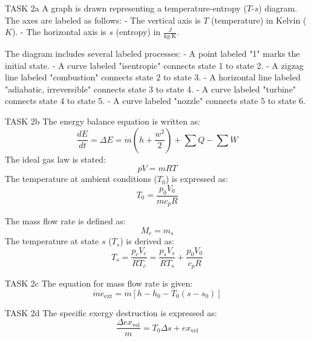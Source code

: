 TASK 2a  
A graph is drawn representing a temperature-entropy (\( T \)-\( s \)) diagram. The axes are labeled as follows:  
- The vertical axis is \( T \) (temperature) in Kelvin (\( K \)).  
- The horizontal axis is \( s \) (entropy) in \( \frac{J}{\text{kg·K}} \).  

The diagram includes several labeled processes:  
- A point labeled "1" marks the initial state.  
- A curve labeled "isentropic" connects state 1 to state 2.  
- A zigzag line labeled "combustion" connects state 2 to state 3.  
- A horizontal line labeled "adiabatic, irreversible" connects state 3 to state 4.  
- A curve labeled "turbine" connects state 4 to state 5.  
- A curve labeled "nozzle" connects state 5 to state 6.  

TASK 2b  
The energy balance equation is written as:  
\[
\frac{dE}{dt} = \Delta E = \dot{m} \left( h + \frac{w^2}{2} \right) + \sum Q - \sum W
\]  
The ideal gas law is stated:  
\[
pV = mRT
\]  
The temperature at ambient conditions (\( T_0 \)) is expressed as:  
\[
T_0 = \frac{p_0 V_0}{m c_p R}
\]  

The mass flow rate is defined as:  
\[
M_c = m_s
\]  
The temperature at state \( s \) (\( T_s \)) is derived as:  
\[
T_s = \frac{p_c V_c}{R T_c} = \frac{p_s V_s}{R T_s} + \frac{p_0 V_0}{c_p R}
\]  

TASK 2c  
The equation for mass flow rate is given:  
\[
\dot{m} \dot{e}_{\text{ext}} = \dot{m} \left[ h - h_0 - T_0 (s - s_0) \right]
\]  

TASK 2d  
The specific exergy destruction is expressed as:  
\[
\frac{\Delta ex_{\text{vel}}}{m} = T_0 \Delta s + ex_{\text{vel}}
\]